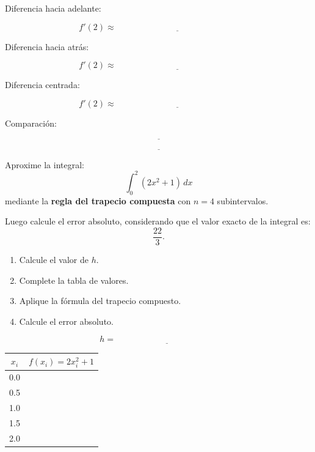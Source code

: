 \documentclass[10pt,respuestas,a4]{aleph-examen}
\begin{document}
\begin{preguntas}
Diferencia hacia adelante:

\[
f'(2)\approx \underline{\hspace{6cm}}
\]

Diferencia hacia atrás:

\[
f'(2)\approx \underline{\hspace{6cm}}
\]

Diferencia centrada:

\[
f'(2)\approx \underline{\hspace{6cm}}
\]

Comparación:

\[
\underline{\hspace{14cm}}
\]

\[
\underline{\hspace{14cm}}
\]


\item
Aproxime la integral: 
\[
\int_0^2 (2x^2+1)\,dx
\]
mediante la \textbf{regla del trapecio compuesta} con $n=4$ subintervalos.

Luego calcule el error absoluto, considerando que el valor exacto de la integral es:
\[
\frac{22}{3}.
\]

\begin{enumerate}[label=\alph*)]
    \item Calcule el valor de $h$.
    \item Complete la tabla de valores.
    \item Aplique la fórmula del trapecio compuesto.
    \item Calcule el error absoluto.
\end{enumerate}

\[
h=\underline{\hspace{5cm}}
\]

\begin{center}
\renewcommand{\arraystretch}{1.4}
\begin{tabular}{c|c}
\toprule
$x_i$ & $f(x_i)=2x_i^2+1$ \\
\midrule
0.0 &  \\
0.5 &  \\
1.0 &  \\
1.5 &  \\
2.0 &  \\
\bottomrule
\end{tabular}
\end{center}


\end{preguntas}
\end{document}
